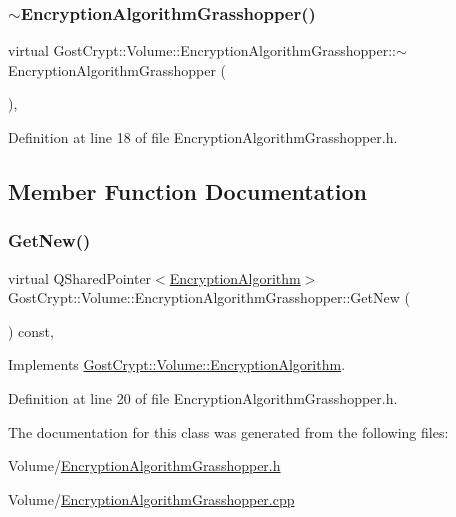 \subsubsection{\texorpdfstring{$\sim$\+Encryption\+Algorithm\+Grasshopper()}{~EncryptionAlgorithmGrasshopper()}}
{\footnotesize\ttfamily virtual Gost\+Crypt\+::\+Volume\+::\+Encryption\+Algorithm\+Grasshopper\+::$\sim$\+Encryption\+Algorithm\+Grasshopper (\begin{DoxyParamCaption}{ }\end{DoxyParamCaption})\hspace{0.3cm}{\ttfamily [inline]}, {\ttfamily [virtual]}}



Definition at line 18 of file Encryption\+Algorithm\+Grasshopper.\+h.



\subsection{Member Function Documentation}
\mbox{\label{class_gost_crypt_1_1_volume_1_1_encryption_algorithm_grasshopper_a86dd6ab97c46ad5e2d6291f6df2d2cac}} 
\subsubsection{\texorpdfstring{Get\+New()}{GetNew()}}
{\footnotesize\ttfamily virtual Q\+Shared\+Pointer$<$\hyperlink{class_gost_crypt_1_1_volume_1_1_encryption_algorithm}{Encryption\+Algorithm}$>$ Gost\+Crypt\+::\+Volume\+::\+Encryption\+Algorithm\+Grasshopper\+::\+Get\+New (\begin{DoxyParamCaption}{ }\end{DoxyParamCaption}) const\hspace{0.3cm}{\ttfamily [inline]}, {\ttfamily [virtual]}}



Implements \hyperlink{class_gost_crypt_1_1_volume_1_1_encryption_algorithm_ab77654d47cfabd0937eab82beaaac277}{Gost\+Crypt\+::\+Volume\+::\+Encryption\+Algorithm}.



Definition at line 20 of file Encryption\+Algorithm\+Grasshopper.\+h.



The documentation for this class was generated from the following files\+:\begin{DoxyCompactItemize}
\item 
Volume/\hyperlink{_encryption_algorithm_grasshopper_8h}{Encryption\+Algorithm\+Grasshopper.\+h}\item 
Volume/\hyperlink{_encryption_algorithm_grasshopper_8cpp}{Encryption\+Algorithm\+Grasshopper.\+cpp}\end{DoxyCompactItemize}
